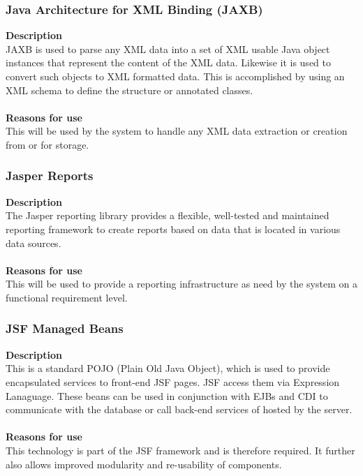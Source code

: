 \documentclass[12pt]{article}
\begin{document}
\subsubsection{Java Architecture for XML Binding (JAXB)}
\textbf{Description}\\
JAXB is used to parse any XML data into a set of XML usable Java object instances that represent the content of the XML data. Likewise it is used to convert such objects to XML formatted data. This is accomplished by using an XML schema to define the structure or annotated classes.\\\\
\textbf{Reasons for use}\\
This will be used by the system to handle any XML data extraction or creation from or for storage.

\subsubsection{Jasper Reports}
\textbf{Description}\\
The Jasper reporting library provides a flexible, well-tested and maintained reporting framework to create reports based on data that is located in various data sources.\\\\
\textbf{Reasons for use}\\
This will be used to provide a reporting infrastructure as need by the system on a functional requirement level.   

\subsubsection{JSF Managed Beans}
\textbf{Description}\\
This is a standard POJO (Plain Old Java Object), which is used to provide encapsulated services to  front-end JSF pages. JSF access them via Expression Lanaguage. These beans can be used in conjunction with EJBs and CDI to communicate with the database or call back-end services of hosted by the server.\\\\
\textbf{Reasons for use}\\
This technology is part of the JSF framework and is therefore required. It further also allows improved modularity and re-usability of components.
\end{document}
